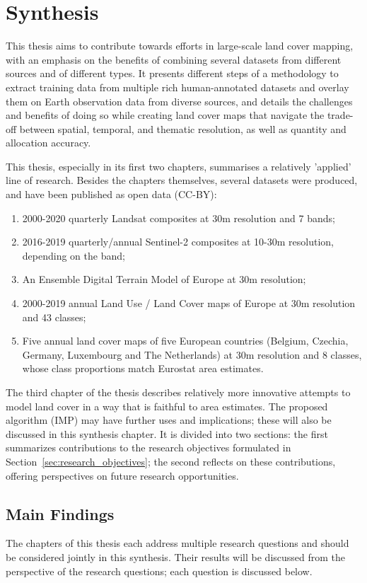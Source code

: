 \chapter[Synthesis]{Synthesis}
\label{cha:Chapter6}
\newpage

This thesis aims to contribute towards efforts in large-scale land cover mapping, with an emphasis on the benefits of combining several datasets from different sources and of different types. It presents different steps of a methodology to extract training data from multiple rich human-annotated datasets and overlay them on Earth observation data from diverse sources, and details the challenges and benefits of doing so while creating land cover maps that navigate the trade-off between spatial, temporal, and thematic resolution, as well as quantity and allocation accuracy.

This thesis, especially in its first two chapters, summarises a relatively 'applied' line of research. Besides the chapters themselves, several datasets were produced, and have been published as open data (CC-BY):
\begin{enumerate}
    \item 2000-2020 quarterly Landsat composites at 30m resolution and 7 bands;
    \item 2016-2019 quarterly/annual Sentinel-2 composites at 10-30m resolution, depending on the band;
    \item An Ensemble Digital Terrain Model of Europe at 30m resolution;
    \item 2000-2019 annual Land Use / Land Cover maps of Europe at 30m resolution and 43 classes;
    \item Five annual land cover maps of five European countries (Belgium, Czechia, Germany, Luxembourg and The Netherlands) at 30m resolution and 8 classes, whose class proportions match Eurostat area estimates.
\end{enumerate}
The third chapter of the thesis describes relatively more innovative attempts to model land cover in a way that is faithful to area estimates. The proposed algorithm (IMP) may have further uses and implications; these will also be discussed in this synthesis chapter. It is divided into two sections: the first summarizes contributions to the research objectives formulated in Section~\ref{sec:research_objectives}; the second reflects on these contributions, offering perspectives on future research opportunities. 

\section{Main Findings}
    The chapters of this thesis each address multiple research questions and should be considered jointly in this synthesis. Their results will be discussed from the perspective of the research questions; each question is discussed below.
    
